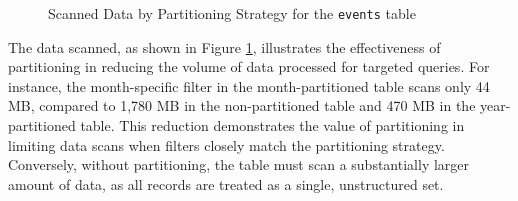 
\begin{figure}[h!]
    \centering
    \caption{Scanned Data by Partitioning Strategy for the \texttt{events} table}
    \label{fig:eventscan}
\end{figure}

The data scanned, as shown in Figure \ref{fig:eventscan}, illustrates the effectiveness of partitioning in reducing the volume of data processed for targeted queries. For instance, the month-specific filter in the month-partitioned table scans only 44 MB, compared to 1,780 MB in the non-partitioned table and 470 MB in the year-partitioned table. This reduction demonstrates the value of partitioning in limiting data scans when filters closely match the partitioning strategy. Conversely, without partitioning, the table must scan a substantially larger amount of data, as all records are treated as a single, unstructured set. 

